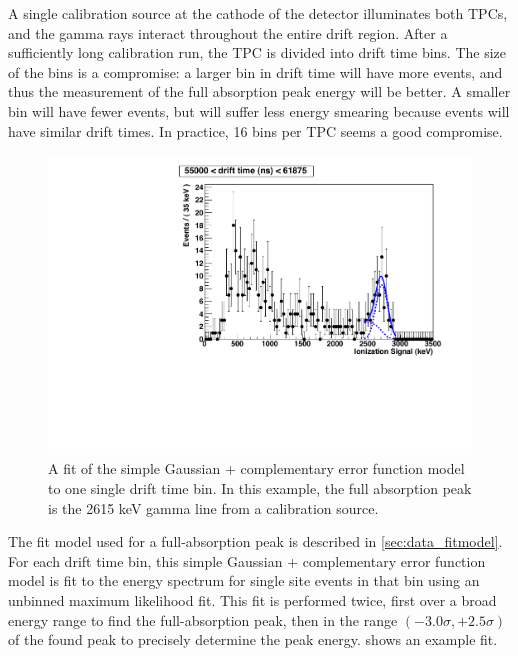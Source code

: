 \documentclass[herrin-thesis.tex]{subfiles}
\begin{document}
A single calibration source at the cathode of the detector illuminates both TPCs, and the gamma rays interact throughout the entire drift region. After a sufficiently long calibration run, the TPC is divided into drift time bins. The size of the bins is a compromise: a larger bin in drift time will have more events, and thus the measurement of the full absorption peak energy will be better. A smaller bin will have fewer events, but will suffer less energy smearing because events will have similar drift times. In practice, 16 bins per TPC seems a good compromise.

\begin{figure}[tbp]
\centering
\includegraphics[width=0.6\columnwidth]{./plots/el_run4034_dt_bin_fit.pdf}
\caption[A fit to the full-absorption peak in a drift time bin]{A fit of the simple Gaussian + complementary error function model to one single drift time bin. In this example, the full absorption peak is the 2615 keV gamma line from a  calibration source.}
\label{fig:el_dtbinfit}
\end{figure}

The fit model used for a full-absorption peak is described in \cref{sec:data_fitmodel}. For each drift time bin, this simple Gaussian + complementary error function model is fit to the energy spectrum for single site events in that bin using an unbinned maximum likelihood fit. This fit is performed twice, first over a broad energy range to find the full-absorption peak, then in the range \((-3.0\sigma, +2.5\sigma)\) of the found peak to precisely determine the peak energy.  shows an example fit.
\end{document}
